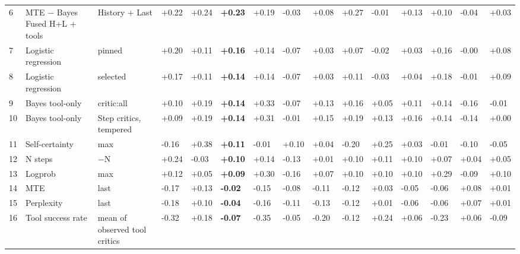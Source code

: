 \documentclass[10pt,a4paper]{article}
\begin{document}
\begin{longtable}{@{}R{8.000mm}L{38.000mm}L{30.000mm}C{14.000mm}C{14.000mm}C{14.000mm}C{14.000mm}C{14.000mm}C{14.000mm}C{14.000mm}C{14.000mm}C{14.000mm}C{14.000mm}C{14.000mm}C{14.000mm}@{}}
6 & MTE \ensuremath{-} Bayes Fused H+L + tools & History + Last & +0.22 & +0.24 & \textbf{+0.23} & +0.19 & -0.03 & +0.08 & +0.27 & -0.01 & +0.13 & +0.10 & -0.04 & +0.03 \\
7 & Logistic regression & pinned & +0.20 & +0.11 & \textbf{+0.16} & +0.14 & -0.07 & +0.03 & +0.07 & -0.02 & +0.03 & +0.16 & -0.00 & +0.08 \\
8 & Logistic regression & selected & +0.17 & +0.11 & \textbf{+0.14} & +0.14 & -0.07 & +0.03 & +0.11 & -0.03 & +0.04 & +0.18 & -0.01 & +0.09 \\
9 & Bayes tool-only & critic:all & +0.10 & +0.19 & \textbf{+0.14} & +0.33 & -0.07 & +0.13 & +0.16 & +0.05 & +0.11 & +0.14 & -0.16 & -0.01 \\
10 & Bayes tool-only & Step critics, tempered & +0.09 & +0.19 & \textbf{+0.14} & +0.31 & -0.01 & +0.15 & +0.19 & +0.13 & +0.16 & +0.14 & -0.14 & +0.00 \\
11 & Self-certainty & max & -0.16 & +0.38 & \textbf{+0.11} & -0.01 & +0.10 & +0.04 & -0.20 & +0.25 & +0.03 & -0.01 & -0.10 & -0.05 \\
12 & N steps & \ensuremath{-}N & +0.24 & -0.03 & \textbf{+0.10} & +0.14 & -0.13 & +0.01 & +0.10 & +0.11 & +0.10 & +0.07 & +0.04 & +0.05 \\
13 & Logprob & max & +0.12 & +0.05 & \textbf{+0.09} & +0.30 & -0.16 & +0.07 & +0.10 & +0.10 & +0.10 & +0.29 & -0.09 & +0.10 \\
14 & MTE & last & -0.17 & +0.13 & \textbf{-0.02} & -0.15 & -0.08 & -0.11 & -0.12 & +0.03 & -0.05 & -0.06 & +0.08 & +0.01 \\
15 & Perplexity & last & -0.18 & +0.10 & \textbf{-0.04} & -0.16 & -0.11 & -0.13 & -0.12 & +0.01 & -0.06 & -0.06 & +0.07 & +0.01 \\
16 & Tool success rate & mean of observed tool critics & -0.32 & +0.18 & \textbf{-0.07} & -0.35 & -0.05 & -0.20 & -0.12 & +0.24 & +0.06 & -0.23 & +0.06 & -0.09 \\
\end{longtable}
\endgroup
\Needspace{50mm}
\end{document}
